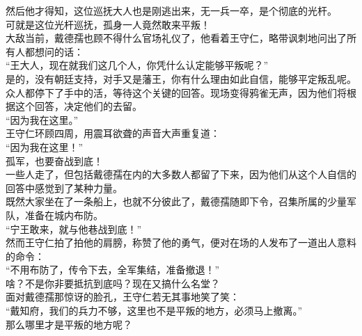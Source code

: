 \begin{multicols}{\theparacolNo}
然后他才得知，这位巡抚大人也是刚逃出来，无一兵一卒，是个彻底的光杆。\\

可就是这位光杆巡抚，孤身一人竟然敢来平叛！\\

大敌当前，戴德孺也顾不得什么官场礼仪了，他看着王守仁，略带讽刺地问出了所有人都想问的话：\\

“王大人，现在就我们这几个人，你凭什么认定能够平叛呢？”\\

是的，没有朝廷支持，对手又是藩王，你有什么理由如此自信，能够平定叛乱呢。\\

众人都停下了手中的活，等待这个关键的回答。现场变得鸦雀无声，因为他们将根据这个回答，决定他们的去留。\\

“因为我在这里。”\\

王守仁环顾四周，用震耳欲聋的声音大声重复道：\\

“因为我在这里！”\\

孤军，也要奋战到底！\\

一些人走了，但包括戴德孺在内的大多数人都留了下来，因为他们从这个人自信的回答中感觉到了某种力量。\\

既然大家坐在了一条船上，也就不分彼此了，戴德孺随即下令，召集所属的少量军队，准备在城内布防。\\

“宁王敢来，就与他巷战到底！”\\

然而王守仁拍了拍他的肩膀，称赞了他的勇气，便对在场的人发布了一道出人意料的命令：\\

“不用布防了，传令下去，全军集结，准备撤退！”\\

啥？不是你非要抵抗到底吗？现在又搞什么名堂？\\

面对戴德孺那惊讶的脸孔，王守仁若无其事地笑了笑：\\

“戴知府，我们的兵力不够，这里也不是平叛的地方，必须马上撤离。”\\

那么哪里才是平叛的地方呢？\\


\end{multicols}
